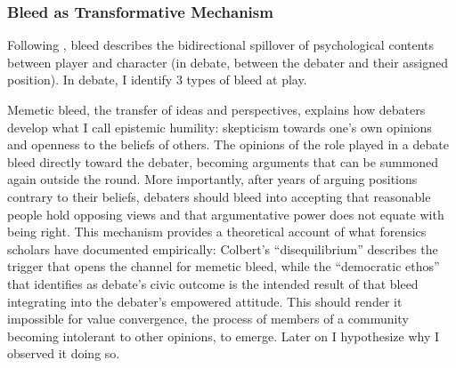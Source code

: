 \documentclass[12pt]{article}
\begin{document}

\subsubsection{Bleed as Transformative Mechanism}

Following \textcite{hugaas2024bleed}, bleed describes the bidirectional spillover of psychological contents between player and character (in debate, between the debater and their assigned position). In debate, I identify 3 types of bleed at play.

Memetic bleed, the transfer of ideas and perspectives, explains how debaters develop what I call epistemic humility: skepticism towards one's own opinions and openness to the beliefs of others. The opinions of the role played in a debate bleed directly toward the debater, becoming arguments that can be summoned again outside the round. More importantly, after years of arguing positions contrary to their beliefs, debaters should bleed into accepting that reasonable people hold opposing views and that argumentative power does not equate with being right. This mechanism provides a theoretical account of what forensics scholars have documented empirically: Colbert's ``disequilibrium'' \parencite{colbert1995enhancing} describes the trigger that opens the channel for memetic bleed, while the ``democratic ethos'' that \textcite{hicks1998public} identifies as debate's civic outcome is the intended result of that bleed integrating into the debater's empowered attitude. This should render it impossible for value convergence, the process of members of a community becoming intolerant to other opinions, to emerge. Later on I hypothesize why I observed it doing so.
\end{document}
